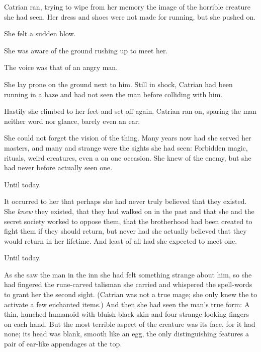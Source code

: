 \begin{comment}
\chapter{Silenced}
\end{comment}
\begin{garbage}

%

Catrian ran, trying to wipe from her memory the image of the horrible creature she had seen. Her dress and shoes were not made for running, but she pushed on. 

She felt a sudden blow. 

She was aware of the ground rushing up to meet her. 

 The voice was that of an angry man. 

She lay prone on the ground next to him. Still in shock, Catrian had been running in a haze and had not seen the man before colliding with him. 

Hastily she climbed to her feet and set off again. 
Catrian ran on, sparing the man neither word nor glance, barely even an ear. 

She could not forget the vision of the thing. Many years now had she served her masters, and many and strange were the sights she had seen: Forbidden magic, rituals, weird creatures, even a \dragon{} on one occasion. She knew of the enemy, but she had never before actually seen one. 

Until today. 

It occurred to her that perhaps she had never truly believed that they existed. She \emph{knew} they existed, that they had walked on \Miith{} in the past and that she and the secret society worked to oppose them, that the brotherhood had been created to fight them if they should return, but never had she actually believed that they would return in her lifetime. And least of all had she expected to meet one. 

Until today. 

As she saw the man in the inn she had felt something strange about him, so she had fingered the rune-carved talisman she carried and whispered the spell-words to grant her the second sight. 
(Catrian was not a true mage; she only knew the  to activate a few enchanted items.) 
And then she had seen the man's true form: A thin, hunched humanoid with bluish-black skin and four strange-looking fingers on each hand. But the most terrible aspect of the creature was its face, for it had none; its head was blank, smooth like an egg, the only distinguishing features a pair of ear-like appendages at the top. 


\end{garbage}
